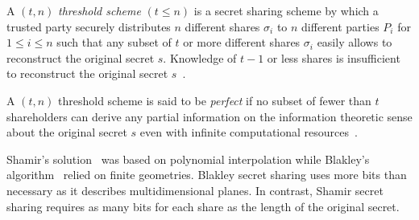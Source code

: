 \begin{defn}
\label{def:threshold_scheme}
 A $\left( t, n \right)$ \textit{threshold scheme} $\left( t \leq n \right)$ is a secret sharing scheme by which a trusted party securely distributes $n$ different shares $\sigma_i$ to $n$ different parties $P_i$ for $1 \leq i \leq n$ such that any subset of $t$ or more different shares $\sigma_i$ easily allows to reconstruct the original secret $s$. Knowledge of $t-1$ or less shares is insufficient to reconstruct the original secret $s$~\cite{book:handbook_of_applied_cryptography}.
\end{defn}

\begin{defn}
\label{def:threshold_scheme}
 A $\left( t, n \right)$ threshold scheme is said to be \textit{perfect} if no subset of fewer than $t$ shareholders can derive any partial information on the information theoretic sense about the original secret $s$ even with infinite computational resources~\cite{book:handbook_of_applied_cryptography}.
\end{defn}

Shamir's solution~\cite{art:Shamir79} was based on polynomial interpolation while Blakley's algorithm~\cite{art:Blakley79} relied on finite geometries. Blakley secret sharing uses more bits than necessary as it describes multidimensional planes. In contrast, Shamir secret sharing requires as many bits for each share as the length of the original secret.


